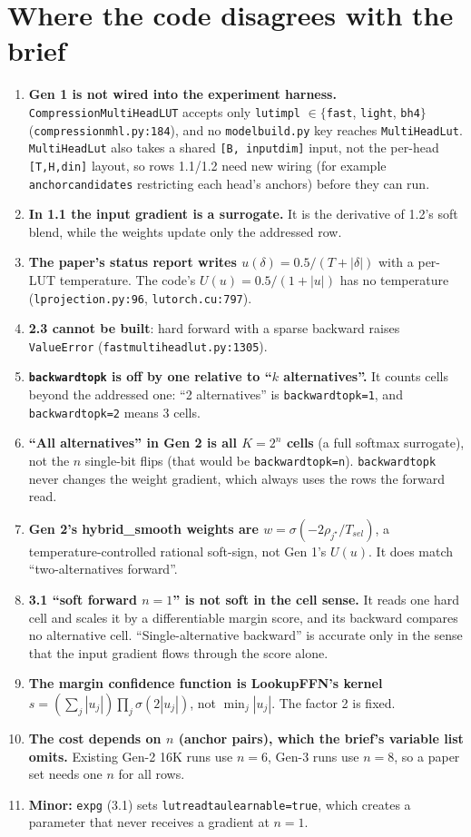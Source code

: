 \documentclass[10pt]{article}
\newcommand{\code}[1]{{\renewcommand{\_}{\textunderscore\allowbreak}\texttt{#1}}}
\begin{document}
\section*{Where the code disagrees with the brief}
\begin{enumerate}\setlength\itemsep{1pt}
\item \textbf{Gen 1 is not wired into the experiment harness.} \code{CompressionMultiHeadLUT} accepts only
  \code{lut\_impl} $\in\{$\code{fast}, \code{light}, \code{bh4}$\}$ (\code{compression\_mhl.py:184}), and no \code{model\_build.py} key reaches
  \code{MultiHeadLut}. \code{MultiHeadLut} also takes a shared \code{[B, input\_dim]} input, not the per-head \code{[T,H,d\_in]} layout, so
  rows 1.1/1.2 need new wiring (for example \code{anchor\_candidates} restricting each head's anchors) before they can run.
\item \textbf{In 1.1 the input gradient is a surrogate.} It is the derivative of 1.2's soft blend, while the weights update only the addressed row.
\item \textbf{The paper's status report writes $u(\delta)=0.5/(T+|\delta|)$} with a per-LUT temperature. The code's
  $U(u)=0.5/(1+|u|)$ has no temperature (\code{l\_projection.py:96}, \code{lutorch.cu:797}).
\item \textbf{2.3 cannot be built}: hard forward with a sparse backward raises \code{ValueError} (\code{fast\_multi\_head\_lut.py:1305}).
\item \textbf{\code{backward\_topk} is off by one relative to ``$k$ alternatives''.} It counts cells beyond the addressed one:
  ``2 alternatives'' is \code{backward\_topk=1}, and \code{backward\_topk=2} means 3 cells.
\item \textbf{``All alternatives'' in Gen 2 is all $K=2^n$ cells} (a full softmax surrogate), not the $n$ single-bit flips (that would be \code{backward\_topk=n}).
  \code{backward\_topk} never changes the weight gradient, which always uses the rows the forward read.
\item \textbf{Gen 2's hybrid\_smooth weights are $w=\sigma(-2\rho_{j^\star}/T_{sel})$}, a temperature-controlled rational soft-sign, not Gen 1's $U(u)$. It does match ``two-alternatives forward''.
\item \textbf{3.1 ``soft forward $n{=}1$'' is not soft in the cell sense.} It reads one hard cell and scales it by a differentiable margin score, and its backward compares no alternative cell.
  ``Single-alternative backward'' is accurate only in the sense that the input gradient flows through the score alone.
\item \textbf{The margin confidence function is LookupFFN's kernel} $s=(\sum_j|u_j|)\prod_j\sigma(2|u_j|)$, not $\min_j|u_j|$. The factor 2 is fixed.
\item \textbf{The cost depends on $n$ (anchor pairs), which the brief's variable list omits.} Existing Gen-2 16K runs use $n=6$, Gen-3 runs use $n=8$, so a paper set needs one $n$ for all rows.
\item \textbf{Minor:} \code{exp\_g\_0207} (3.1) sets \code{lut\_read\_tau\_learnable=true}, which creates a parameter that never receives a gradient at $n=1$.
\end{enumerate}
\end{document}
